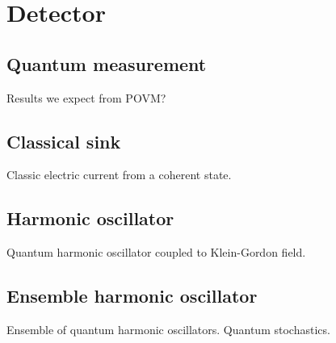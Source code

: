 \section{Detector}

\subsection{Quantum measurement}

Results we expect from POVM?

\subsection{Classical sink}

Classic electric current from a coherent state.

\subsection{Harmonic oscillator}

Quantum harmonic oscillator coupled to Klein-Gordon field.

\subsection{Ensemble harmonic oscillator}

Ensemble of quantum harmonic oscillators.
Quantum stochastics.